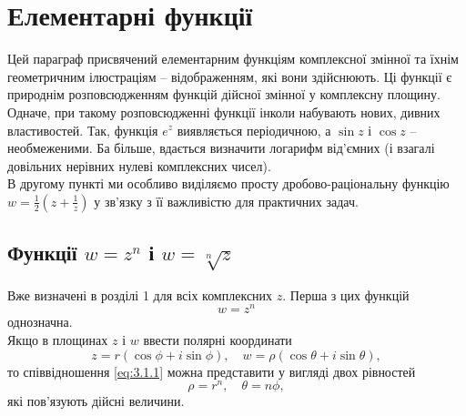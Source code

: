
% 

% 

\setcounter{section}{2}
\section{Елементарні функції}

Цей параграф присвячений елементарним функціям комплексної змінної та їхнім геометричним ілюстраціям -- відображенням, які вони здійснюють. Ці функції є природнім розповсюдженням функцій дійсної змінної у комплексну площину. \\

Одначе, при такому розповсюдженні функції інколи набувають нових, дивних властивостей. Так, функція $e^z$ виявляється періодичною, а $\sin z$ і $\cos z$ -- необмеженими. Ба більше, вдається визначити логарифм від'ємних (і взагалі довільних нерівних нулеві комплексних чисел). \\

В другому пункті ми особливо виділяємо просту дробово-раціональну функцію $w = \frac12 \left(z + \frac 1z\right)$ у зв'язку з її важливістю для практичних задач.

\subsection{Функції $w = z^n$ і $w = \sqrt[n]{z}$}

Вже визначені в розділі 1 для всіх комплексних $z$. Перша з цих функцій
\begin{equation}
	\label{eq:3.1.1}
	w = z^n
\end{equation}
однозначна. \\

Якщо в площинах $z$ і $w$ ввести полярні координати 
\begin{equation}
	\label{eq:3.1.2}
	z = r (\cos \phi + i \sin \phi),\quad w = \rho (\cos \theta + i \sin \theta),
\end{equation}
то співвідношення \eqref{eq:3.1.1} можна представити у вигляді двох рівностей
\begin{equation}
	\label{eq:3.1.3}
	\rho = r^n, \quad \theta = n \phi,
\end{equation}
які пов'язують дійсні величини. \\

